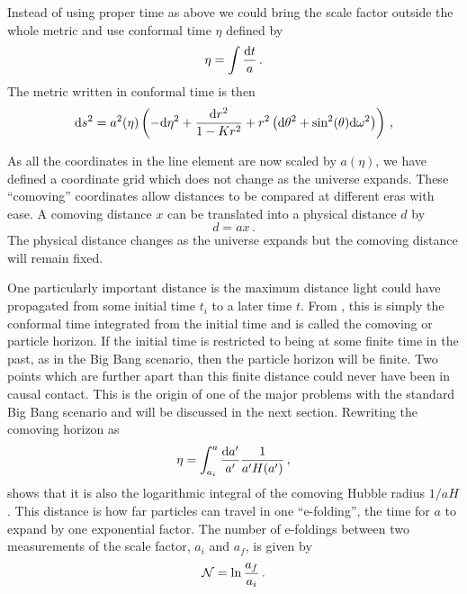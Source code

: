 Instead of using proper time as above we could bring
the scale factor outside the whole metric and use conformal time $\eta$
defined by
\begin{equation}
\label{eq:etatime-intro}
 \eta = \int\frac{\mathrm{d} t}{a}\,.
\end{equation}
% 
The metric written in conformal time is then 
% 
\begin{equation}
 \label{eq:frwconformal-intro}
\mathrm{d} s^2 = a^2(\eta)
  \left( -\mathrm{d}\eta^2 +
    \frac{\mathrm{d} r^2}{1-Kr^2} + r^2\left(\mathrm{d}\theta^2 + \sin^2(\theta)
\mathrm{d}\omega^2\right)
  \right)\,,
\end{equation}

% 
As all the coordinates in the line element are now scaled by $a(\eta)$, we
have defined a coordinate grid which does not change as the universe expands.
These ``comoving'' coordinates allow distances to be compared at different
eras with ease. A comoving distance $x$ can be translated into a physical
distance $d$ by
% 
\begin{equation}
 \label{eq:comovingdefn-intro}
 d = ax \,.
\end{equation}
The physical distance changes as the universe expands but the comoving distance
will remain fixed. 

One particularly important distance is the maximum distance light could have
propagated from some initial time $t_i$ to a later time $t$. From
, this is simply the conformal time integrated from
the initial time and is called the comoving or particle horizon.
If the initial time is restricted to
being at some finite time in the past, as in the Big Bang scenario, then the
particle horizon will be finite. Two points which are further apart than
this finite distance could never have been in causal contact. This
is the origin of one of the major problems with the standard Big Bang scenario
and will be discussed in the next section.
Rewriting the comoving horizon as
% 
\begin{equation}
\label{eq:etalog-intro}
 \eta = \int_{a_i}^a \frac{\mathrm{d} a'}{a'} \frac{1}{a' H(a')} \,,
\end{equation}
shows that it is also the logarithmic integral of the comoving Hubble
radius $1/aH$. This distance is how far particles can travel in one
``e-folding'', the time for $a$ to expand by one exponential factor. 
The number of e-foldings between two measurements of the scale factor, $a_i$
and $a_f$, is given by
\begin{equation}
\label{eq:nefolddefn-intro}
 \mathcal{N} = \ln \frac{a_f}{a_i}\,.
\end{equation}

